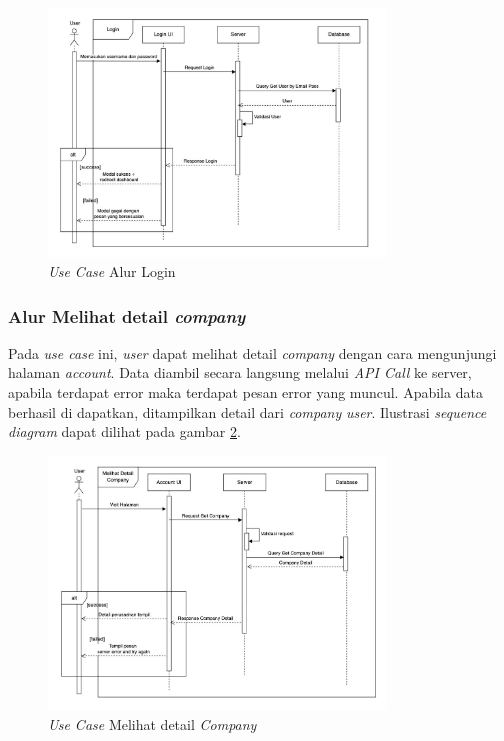 \begin{figure}[ht]
  \centering
  \includegraphics[width=0.8\textwidth]{resources/chapter-3/usecase/uc-05.jpg}
  \caption{\textit{Use Case} Alur Login}
  \label{fig:usecase-05}
\end{figure}

\pagebreak

\subsubsection{Alur Melihat detail \textit{company}}

Pada \textit{use case} ini, \textit{user} dapat melihat detail \textit{company} dengan cara mengunjungi halaman \textit{account}. Data diambil secara langsung melalui \textit{API Call} ke server, apabila terdapat error maka terdapat pesan error yang muncul. Apabila data berhasil di dapatkan, ditampilkan detail dari \textit{company} \textit{user}. Ilustrasi \textit{sequence diagram} dapat dilihat pada gambar \ref{fig:usecase-06}.

\begin{figure}[ht]
  \centering
  \includegraphics[width=0.8\textwidth]{resources/chapter-3/usecase/uc-06.jpg}
  \caption{\textit{Use Case} Melihat detail \textit{Company}}
  \label{fig:usecase-06}
\end{figure}

